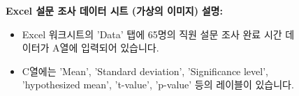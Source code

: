 \documentclass[11pt,a4paper]{book}
\providecommand{\captionof}[2]{\textbf{#2}}
\theoremstyle{definition}
\begin{document}
\begin{figure}[h!]
    \centering
    \captionof{figure}{Excel 설문 조사 데이터 시트 (가상의 이미지)}
    \label{fig:excel_survey_data}
    \vspace{0.5em}
    \textbf{설명:}
    \begin{itemize}
        \item Excel 워크시트의 'Data' 탭에 65명의 직원 설문 조사 완료 시간 데이터가 A열에 입력되어 있습니다.
        \item C열에는 'Mean', 'Standard deviation', 'Significance level', 'hypothesized mean', 't-value', 'p-value' 등의 레이블이 있습니다.
    \end{itemize}
\end{figure}
\end{document}
